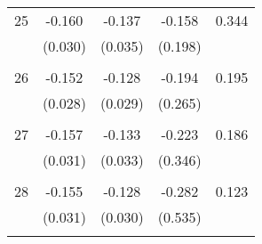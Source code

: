 \begin{tabular}{l*{1}{cccc}}
  25       & -0.160 & -0.137 & -0.158 & 0.344 \\
          & (0.030) & (0.035) & (0.198) & \\
 & & & &\\
  26       & -0.152 & -0.128 & -0.194 & 0.195 \\
          & (0.028) & (0.029) & (0.265) & \\
 & & & &\\
  27       & -0.157 & -0.133 & -0.223 & 0.186 \\
          & (0.031) & (0.033) & (0.346) & \\
 & & & &\\
  28       & -0.155 & -0.128 & -0.282 & 0.123 \\
          & (0.031) & (0.030) & (0.535) & \\
 & & & &\\
\hline\hline
\end{tabular}
